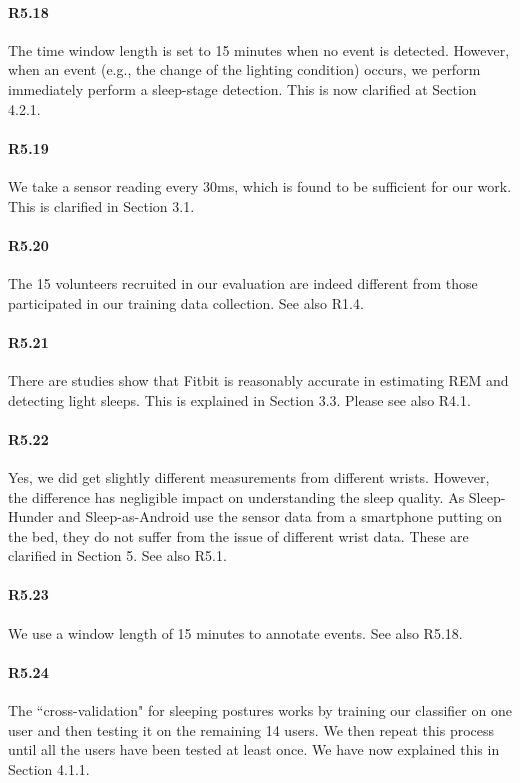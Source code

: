\paragraph{R5.18} The time window length is set to 15 minutes when no event is detected. However, when an event (e.g., the change of the
lighting condition) occurs, we perform immediately perform a sleep-stage detection. This is now clarified at Section 4.2.1.

\paragraph{R5.19} We take a sensor reading every 30ms, which is found to be sufficient for our work. This is clarified in Section 3.1.

\paragraph{R5.20} The 15 volunteers recruited in our evaluation are indeed different from those participated in our training data collection. See also R1.4.

\paragraph{R5.21} There are studies show that Fitbit is reasonably accurate in estimating REM and detecting light sleeps. This is explained in Section 3.3.
Please see also R4.1.

\paragraph{R5.22} Yes, we did get slightly different measurements from different wrists. However, the difference has negligible impact on
understanding the sleep quality. As Sleep-Hunder and Sleep-as-Android use the sensor data from a smartphone putting on the bed, they do not
suffer from the issue of different wrist data. These are clarified in Section 5. See also R5.1.


\paragraph{R5.23} We use a window length of 15 minutes to annotate events. See also R5.18.

\paragraph{R5.24} The ``cross-validation" for sleeping postures works by training our classifier on one user and then testing it on the
remaining 14 users. We then repeat this process until all the users have been tested at least once. We have now explained this in Section
4.1.1.


